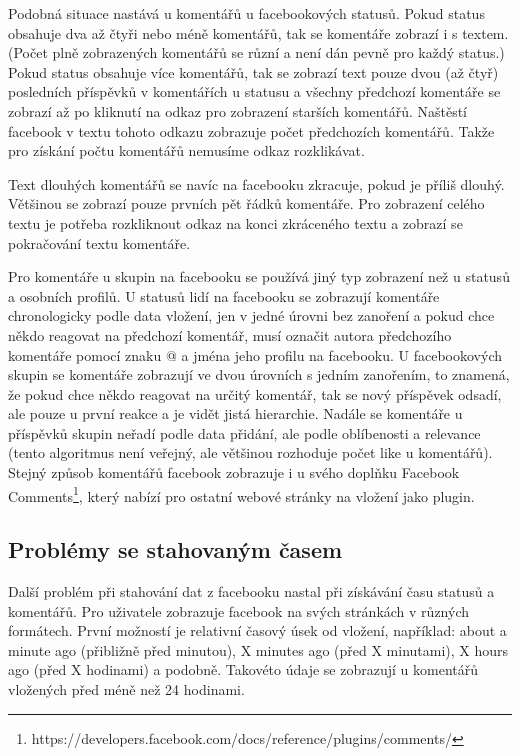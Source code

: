 \documentclass[thesis=M,czech]{FITthesis}[2013/05/10]
\begin{document}
Podobná situace nastává u komentářů u facebookových statusů. Pokud status obsahuje dva až čtyři nebo méně komentářů, tak se komentáře zobrazí i s textem. (Počet plně zobrazených komentářů se různí a není dán pevně pro každý status.) Pokud status obsahuje  více komentářů, tak se zobrazí text pouze dvou (až čtyř) posledních příspěvků v komentářích u statusu a všechny předchozí komentáře se zobrazí až po kliknutí na odkaz pro zobrazení starších komentářů. Naštěstí facebook v textu tohoto odkazu zobrazuje počet předchozích komentářů. Takže pro získání počtu komentářů nemusíme odkaz rozklikávat. 

Text dlouhých komentářů se navíc na facebooku zkracuje, pokud je příliš dlouhý. Většinou se zobrazí pouze prvních pět řádků komentáře. Pro zobrazení celého textu je potřeba rozkliknout odkaz na konci zkráceného textu a zobrazí se pokračování textu komentáře. 

Pro komentáře u skupin na facebooku se používá jiný typ zobrazení než u statusů a osobních profilů. U statusů lidí na facebooku se zobrazují komentáře chronologicky podle data vložení, jen v jedné úrovni bez zanoření a pokud chce někdo reagovat na předchozí komentář, musí označit autora předchozího komentáře pomocí znaku @ a jména jeho profilu na facebooku. U facebookových skupin se komentáře zobrazují ve dvou úrovních s jedním zanořením, to znamená, že pokud chce někdo reagovat na určitý komentář, tak se nový příspěvek odsadí, ale pouze u první reakce a je vidět jistá hierarchie. Nadále se komentáře u příspěvků skupin neřadí podle data přidání, ale podle oblíbenosti a relevance (tento algoritmus není veřejný, ale většinou rozhoduje počet like u komentářů). Stejný způsob komentářů facebook zobrazuje i u svého doplňku Facebook Comments\footnote{https://developers.facebook.com/docs/reference/plugins/comments/}, který nabízí pro ostatní webové stránky na vložení jako plugin. 

\subsection{Problémy se stahovaným časem}

Další problém při stahování dat z facebooku nastal při získávání času statusů a komentářů. Pro uživatele zobrazuje facebook na svých stránkách v různých formátech. První možností je relativní časový úsek od vložení, například: about a minute ago (přibližně před minutou), X minutes ago (před X minutami), X hours ago (před X hodinami) a podobně. Takovéto údaje se zobrazují u komentářů vložených před méně než 24 hodinami. 
\end{document}
